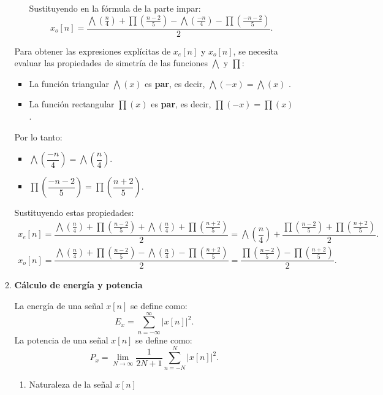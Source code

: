 \begin{enumerate}[label=\color{red}\textbf{\arabic*)}]
\begin{enumerate}[label=\textbf{\arabic*)}]
\begin{enumerate}[label=\alph*)]
                    Sustituyendo en la fórmula de la parte impar:  \[
                        x_o[n]=\dfrac{\bigwedge\left( \frac{n}{4}  \right) +\prod\left( \frac{n-2}{5}  \right) -\bigwedge\left( \frac{-n}{4}  \right) -\prod\left( \frac{-n-2}{5}  \right) }{2}.
                    \] 
            \end{enumerate}
            Para obtener las expresiones explícitas de $x_e[n]$ y  $x_o[n]$, se necesita evaluar las propiedades de simetría de las funciones  $\bigwedge$ y  $\prod$:
             \begin{itemize}[label=\textbullet]
                \item La función triangular $\bigwedge(x)$ es  \textbf{par}, es decir, $\bigwedge(-x)=\bigwedge(x)$ .
                \item La función rectangular $\prod(x)$ es  \textbf{par}, es decir, $\prod\left( -x \right) =\prod(x)$ .
            \end{itemize}
            Por lo tanto:
            \begin{itemize}[label=\textbullet]
                \item $\bigwedge\left( \dfrac{-n}{4} \right) =\bigwedge\left( \dfrac{n}{4} \right) $.
                \item $\prod\left( \dfrac{-n-2}{5} \right) =\prod\left( \dfrac{n+2}{5} \right) $.
            \end{itemize}
            Sustituyendo estas propiedades: \[
            \begin{array}{c}
                x_e[n]=\dfrac{\bigwedge\left( \frac{n}{4} \right)+\prod\left( \frac{n-2}{5}  \right) + \bigwedge\left( \frac{n}{4}  \right) +\prod\left( \frac{n+2}{5}  \right) }{2}=\bigwedge\left( \dfrac{n}{4} \right) +\dfrac{\prod\left( \frac{n-2}{5}  \right) +\prod\left( \frac{n+2}{5}  \right) }{2}. \\
                x_o[n]=\dfrac{\bigwedge\left( \frac{n}{4}  \right) +\prod\left( \frac{n-2}{5}  \right) -\bigwedge\left( \frac{n}{4}  \right) -\prod\left( \frac{n+2}{5}  \right) }{2}=\dfrac{\prod\left( \frac{n-2}{5}  \right) -\prod\left( \frac{n+2}{5}  \right) }{2}.
            \end{array}
            \] 
        \item \textbf{Cálculo de energía y potencia}

            La energía de una señal $x[n]$ se define como: \[
                E_x=\sum_{n=-\infty}^{\infty} |x[n]|^2.
            \] 
            La potencia de una señal $x[n]$ se define como:  \[
                P_x=\lim_{N \to \infty} \dfrac{1}{2N+1}\sum_{n=-N}^{N} |x[n]|^2.
            \] 
            \begin{enumerate}[label=\alph*)]
                \item Naturaleza de la señal $x[n]$


\end{enumerate}
\end{enumerate}
\end{enumerate}
